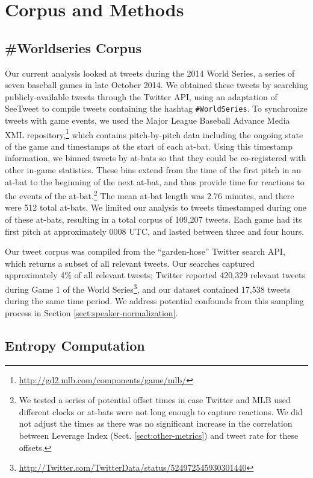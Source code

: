 \documentclass[11pt,letterpaper]{article}
\begin{document}
\section{Corpus and Methods}

\subsection{\#Worldseries Corpus}

Our current analysis looked at tweets during the 2014 World Series, a series of seven baseball games in late October 2014.  We obtained these tweets by searching publicly-available tweets through the Twitter API, using an adaptation of SeeTweet \cite{doyle2014} to compile tweets containing the hashtag {\tt \#WorldSeries}.  To synchronize tweets with game events, we used the Major League Baseball Advance Media XML repository,\footnote{\url{http://gd2.mlb.com/components/game/mlb/}} which contains pitch-by-pitch data including the ongoing state of the game and timestamps at the start of each at-bat. Using this timestamp information, we binned tweets by at-bats so that they could be co-registered with other in-game statistics.  These bins extend from the time of the first pitch in an at-bat to the beginning of the next at-bat, and thus provide time for reactions to the events of the at-bat.\footnote{We tested a series of potential offset times in case Twitter and MLB used different clocks or at-bats were not long enough to capture reactions. We did not adjust the times as there was no significant increase in the correlation between Leverage Index (Sect. \ref{sect:other-metrics}) and tweet rate for these offsets.}  The mean at-bat length was 2.76 minutes, and there were 512 total at-bats.  We limited our analysis to tweets timestamped during one of these at-bats, resulting in a total corpus of 109,207 tweets. Each game had its first pitch at approximately 0008 UTC, and lasted between three and four hours.

Our tweet corpus was compiled from the ``garden-hose'' Twitter search API, which returns a subset of all relevant tweets. Our searches captured approximately 4\% of all relevant tweets; Twitter reported 420,329 relevant tweets during Game 1 of the World Series\footnote{\url{http://Twitter.com/TwitterData/status/524972545930301440}}, and our dataset contained 17,538 tweets during the same time period.  We address potential confounds from this sampling process in Section \ref{sect:speaker-normalization}.

\subsection{Entropy Computation}
\end{document}
